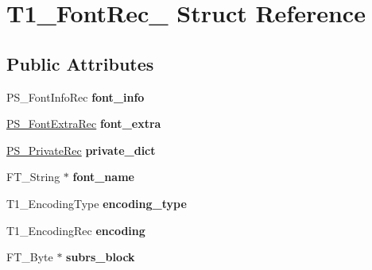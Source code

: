 \hypertarget{struct_t1___font_rec__}{\section{T1\-\_\-\-Font\-Rec\-\_\- Struct Reference}
\label{struct_t1___font_rec__}
}
\subsection*{Public Attributes}
\begin{DoxyCompactItemize}
\item 
\hypertarget{struct_t1___font_rec___a38098edc6279f539983e0d4694b9949a}{P\-S\-\_\-\-Font\-Info\-Rec {\bfseries font\-\_\-info}}\label{struct_t1___font_rec___a38098edc6279f539983e0d4694b9949a}

\item 
\hypertarget{struct_t1___font_rec___a8f2f0990ef8ab29e961047b8c2ceca0d}{\hyperlink{struct_p_s___font_extra_rec__}{P\-S\-\_\-\-Font\-Extra\-Rec} {\bfseries font\-\_\-extra}}\label{struct_t1___font_rec___a8f2f0990ef8ab29e961047b8c2ceca0d}

\item 
\hypertarget{struct_t1___font_rec___a14386570a1b12e477407836e470a258f}{\hyperlink{struct_p_s___private_rec__}{P\-S\-\_\-\-Private\-Rec} {\bfseries private\-\_\-dict}}\label{struct_t1___font_rec___a14386570a1b12e477407836e470a258f}

\item 
\hypertarget{struct_t1___font_rec___a878fc12d0ddda382ffc09c27a7ed81ad}{F\-T\-\_\-\-String $\ast$ {\bfseries font\-\_\-name}}\label{struct_t1___font_rec___a878fc12d0ddda382ffc09c27a7ed81ad}

\item 
\hypertarget{struct_t1___font_rec___a20cb798239623daa4ac7fe833a2a9dc9}{T1\-\_\-\-Encoding\-Type {\bfseries encoding\-\_\-type}}\label{struct_t1___font_rec___a20cb798239623daa4ac7fe833a2a9dc9}

\item 
\hypertarget{struct_t1___font_rec___a78de0ca49e25ea59a2736ec5837c77b4}{T1\-\_\-\-Encoding\-Rec {\bfseries encoding}}\label{struct_t1___font_rec___a78de0ca49e25ea59a2736ec5837c77b4}

\item 
\hypertarget{struct_t1___font_rec___a46675e2cba990def15e0ea01b11578a7}{F\-T\-\_\-\-Byte $\ast$ {\bfseries subrs\-\_\-block}}\label{struct_t1___font_rec___a46675e2cba990def15e0ea01b11578a7}


\end{DoxyCompactItemize}
